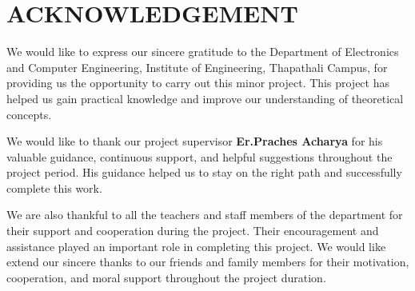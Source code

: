 \chapter*{ACKNOWLEDGEMENT}
{}

We would like to express our sincere gratitude to the Department of Electronics and Computer Engineering, Institute of Engineering, Thapathali Campus, for providing us the opportunity to carry out this minor project. This project has helped us gain practical knowledge and improve our understanding of theoretical concepts.

We would like to thank our project supervisor \textbf{Er.Praches Acharya} for his valuable guidance, continuous support, and helpful suggestions throughout the project period. His guidance helped us to stay on the right path and successfully complete this work.

We are also thankful to all the teachers and staff members of the department for their support and cooperation during the project. Their encouragement and assistance played an important role in completing this project.
We would like extend our sincere thanks to our friends and family members for their motivation, cooperation, and moral support throughout the project duration.

\vspace{1em}
\noindent \authorTable